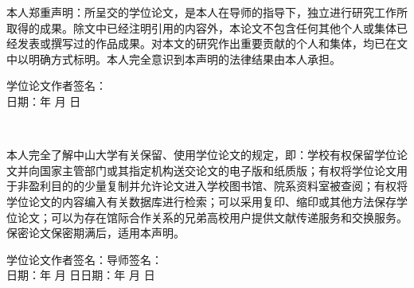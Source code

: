 \documentclass[UTF8,12pt,twoside,a4paper]{ctexart} %
\begin{document}
	\begin{flushleft}%
						\songti
						 \renewcommand{\baselineskip}{1.6em}	%
						
\quad\quad 本人郑重声明：所呈交的学位论文，是本人在导师的指导下，独立进行研究工作所取得的成果。除文中已经注明引用的内容外，本论文不包含任何其他个人或集体已经发表或撰写过的作品成果。对本文的研究作出重要贡献的个人和集体，均已在文中以明确方式标明。本人完全意识到本声明的法律结果由本人承担。
	\end{flushleft}

	\begin{flushright}     %
	\renewcommand{\baselineskip}{1.6em}	%
学位论文作者签名：\quad\quad\quad\quad\quad\quad \\
日期：\quad\quad 年  \quad\quad  月  \quad\quad  日\quad\quad\quad\quad \\
		\end{flushright}

	\begin{center}
	\vspace*{56pt} %
	\\
		\end{center}


	\begin{flushleft}%
						\songti
						 \renewcommand{\baselineskip}{1.6em}	%
						
\quad\quad 本人完全了解中山大学有关保留、使用学位论文的规定，即：学校有权保留学位论文并向国家主管部门或其指定机构送交论文的电子版和纸质版；有权将学位论文用于非盈利目的的少量复制并允许论文进入学校图书馆、院系资料室被查阅；有权将学位论文的内容编入有关数据库进行检索；可以采用复印、缩印或其他方法保存学位论文；可以为存在馆际合作关系的兄弟高校用户提供文献传递服务和交换服务。\\
\quad\quad 保密论文保密期满后，适用本声明。\\

	\end{flushleft}
	
	\begin{flushleft}     %
\renewcommand{\baselineskip}{1.6em}	%
学位论文作者签名：\quad\quad\quad\quad\quad\quad 导师签名：\\
日期：\quad\quad 年  \quad\quad  月  \quad\quad  日\quad\quad\quad  日期：\quad\quad 年  \quad\quad  月  \quad\quad  日\quad\quad\quad\quad\\
		\end{flushleft}
\clearpage{\pagestyle{empty}\cleardoublepage}%
\end{document}
